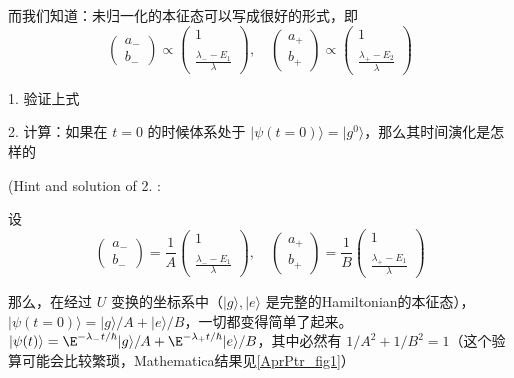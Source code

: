 \begin{exercise}{}
而我们知道：未归一化的本征态可以写成很好的形式，即
\begin{equation}
\left(\begin{matrix}a_-\\b_-\end{matrix}\right) \propto \left(\begin{matrix}1 \\ \ \\ \displaystyle\frac{\lambda_- - E_1}{\lambda}\end{matrix}\right),\quad \left(\begin{matrix}a_+\\b_+\end{matrix}\right) \propto \left(\begin{matrix}1 \\ \ \\ \displaystyle\frac{\lambda_+ - E_2}{\lambda}\end{matrix}\right)
\end{equation}

1. 验证上式

2. 计算：如果在 $t=0$ 的时候体系处于 $|\psi(t=0)\rangle = |g^0\rangle$，那么其时间演化是怎样的

(Hint and solution of 2. :

设
\begin{equation}
\left(\begin{matrix}a_-\\b_-\end{matrix}\right) =\frac{1}{A} \left(\begin{matrix}1 \\ \ \\ \displaystyle\frac{\lambda_- - E_1}{\lambda}\end{matrix}\right),\quad \left(\begin{matrix}a_+\\b_+\end{matrix}\right) =\frac{1}{B} \left(\begin{matrix}1 \\ \ \\ \displaystyle\frac{\lambda_+ - E_1}{\lambda}\end{matrix}\right) 
\end{equation}

那么，在经过 $U$ 变换的坐标系中（$|g\rangle,|e\rangle$ 是完整的Hamiltonian的本征态），$|\psi(t=0)\rangle = |g\rangle/A + |e\rangle/B$，一切都变得简单了起来。 $|\psi(t)\rangle = \E^{-\lambda_-t/\hbar}|g\rangle/A + \E^{-\lambda_+t/\hbar}|e\rangle/B$，其中必然有 $1/A^2 + 1/B^2 = 1$（这个验算可能会比较繁琐，Mathematica结果见\autoref{AprPtr_fig1}）


\end{exercise}
